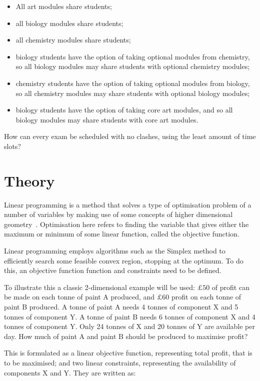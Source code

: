 \begin{itemize}
  \item All art modules share students;
  \item all biology modules share students;
  \item all chemistry modules share students;
  \item biology students have the option of taking optional modules from
  chemistry, so all biology modules may share students with optional chemistry
  modules;
  \item chemistry students have the option of taking optional modules from
  biology, so all chemistry modules may share students with optional biology
  modules;
  \item biology students have the option of taking core art modules, and so all
  biology modules may share students with core art modules.
\end{itemize}

How can every exam be scheduled with no clashes, using the least amount of
time slots?

\section{Theory}\label{sec:linear_programming_theory}

Linear programming is a method that solves a type of optimisation problem of a
number of variables by making use of some concepts of higher dimensional
geometry~\cite{conforti2014integer}.
Optimisation here refers to finding the variable that gives either the maximum
or minimum of some linear function, called the objective function.

Linear programming employs algorithms such as the Simplex
method
to efficiently search some feasible convex region, stopping at the optimum. To
do this, an objective function function and constraints need to be defined.

To illustrate this a classic 2-dimensional example will be used:
\(\pounds 50\) of profit can be made on each
tonne of paint A produced, and \(\pounds 60\) profit on each tonne of paint B
produced. A tonne of paint A needs 4 tonnes of component X and 5 tonnes of
component Y. A tonne of paint B needs 6 tonnes of component X and 4 tonnes of
component Y. Only 24 tonnes of X and 20 tonnes of Y are available per day. How
much of paint A and paint B should be produced to maximise profit?

This is formulated as a linear objective function, representing total profit,
that is to be maximised; and two linear constraints, representing the
availability of components X and Y. They are written as:

